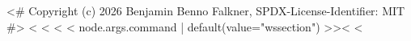 <# Copyright (c) 2026 Benjamin Benno Falkner, SPDX-License-Identifier: MIT #>
<%
<%
\newpage
<%
\<< node.args.command | default(value="wssection") >><%
<%
